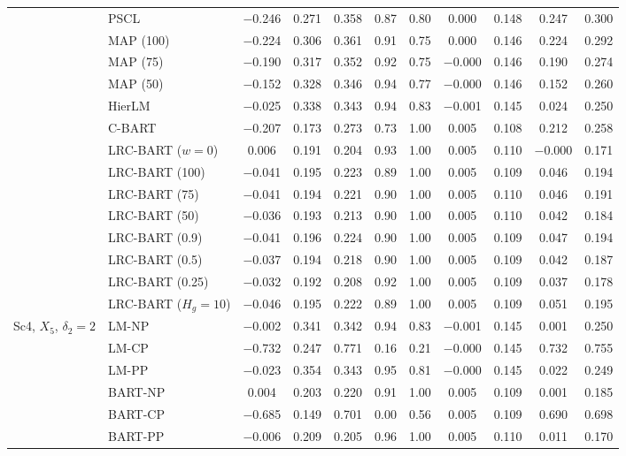\documentclass[11pt]{article}
\theoremstyle{definition}
\theoremstyle{plain}
\begin{document}
\begin{center}
\begin{longtable}{llccccccccc}
& PSCL & $-$0.246 & 0.271 & 0.358 & 0.87 & 0.80 & 0.000 & 0.148 & 0.247 & 0.300 \\
& MAP (100) & $-$0.224 & 0.306 & 0.361 & 0.91 & 0.75 & 0.000 & 0.146 & 0.224 & 0.292 \\
& MAP (75) & $-$0.190 & 0.317 & 0.352 & 0.92 & 0.75 & $-$0.000 & 0.146 & 0.190 & 0.274 \\
& MAP (50) & $-$0.152 & 0.328 & 0.346 & 0.94 & 0.77 & $-$0.000 & 0.146 & 0.152 & 0.260 \\
& HierLM & $-$0.025 & 0.338 & 0.343 & 0.94 & 0.83 & $-$0.001 & 0.145 & 0.024 & 0.250 \\
& C-BART & $-$0.207 & 0.173 & 0.273 & 0.73 & 1.00 & 0.005 & 0.108 & 0.212 & 0.258 \\
& LRC-BART ($w=0$) & 0.006 & 0.191 & 0.204 & 0.93 & 1.00 & 0.005 & 0.110 & $-$0.000 & 0.171 \\
& LRC-BART (100) & $-$0.041 & 0.195 & 0.223 & 0.89 & 1.00 & 0.005 & 0.109 & 0.046 & 0.194 \\
& LRC-BART (75) & $-$0.041 & 0.194 & 0.221 & 0.90 & 1.00 & 0.005 & 0.110 & 0.046 & 0.191 \\
& LRC-BART (50) & $-$0.036 & 0.193 & 0.213 & 0.90 & 1.00 & 0.005 & 0.110 & 0.042 & 0.184 \\
& LRC-BART (0.9) & $-$0.041 & 0.196 & 0.224 & 0.90 & 1.00 & 0.005 & 0.109 & 0.047 & 0.194 \\
& LRC-BART (0.5) & $-$0.037 & 0.194 & 0.218 & 0.90 & 1.00 & 0.005 & 0.109 & 0.042 & 0.187 \\
& LRC-BART (0.25) & $-$0.032 & 0.192 & 0.208 & 0.92 & 1.00 & 0.005 & 0.109 & 0.037 & 0.178 \\
& LRC-BART ($H_g=10$) & $-$0.046 & 0.195 & 0.222 & 0.89 & 1.00 & 0.005 & 0.109 & 0.051 & 0.195 \\
\midrule
\multirow{20}{*}{Sc4, $X_5$, $\delta_2=2$} & LM-NP & $-$0.002 & 0.341 & 0.342 & 0.94 & 0.83 & $-$0.001 & 0.145 & 0.001 & 0.250 \\
& LM-CP & $-$0.732 & 0.247 & 0.771 & 0.16 & 0.21 & $-$0.000 & 0.145 & 0.732 & 0.755 \\
& LM-PP & $-$0.023 & 0.354 & 0.343 & 0.95 & 0.81 & $-$0.000 & 0.145 & 0.022 & 0.249 \\
& BART-NP & 0.004 & 0.203 & 0.220 & 0.91 & 1.00 & 0.005 & 0.109 & 0.001 & 0.185 \\
& BART-CP & $-$0.685 & 0.149 & 0.701 & 0.00 & 0.56 & 0.005 & 0.109 & 0.690 & 0.698 \\
& BART-PP & $-$0.006 & 0.209 & 0.205 & 0.96 & 1.00 & 0.005 & 0.110 & 0.011 & 0.170 \\

\end{longtable}
\end{center}
\end{document}
